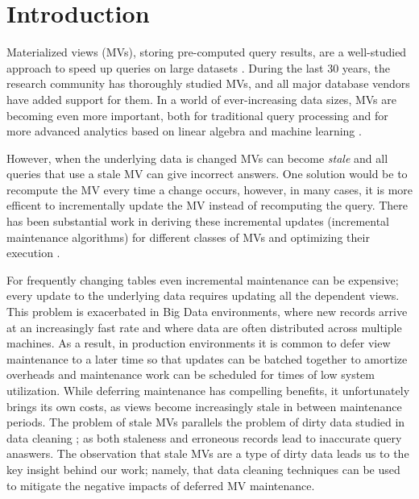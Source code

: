 \vspace{-0.5em}
\section{Introduction}
Materialized views (MVs), storing pre-computed query results, are a well-studied approach to speed up queries on large datasets \cite{LarsonY85, gupta1995maintenance, chirkova2011materialized, halevy2001answering}.
During the last 30 years, the research community has thoroughly studied MVs, and all major database vendors have added support for them.
In a world of ever-increasing data sizes, MVs are becoming even more important, both for traditional query processing
 \cite{lefevre2014opportunistic, bailis2014scalable, perez2014history} and for more advanced analytics based on linear algebra and machine learning \cite{nikolic2014linview, zhang2014mat}.

However, when the underlying data is changed MVs can become \emph{stale} and all queries that use a stale MV can give incorrect answers. 
One solution would be to recompute the MV every time a change occurs, however, in many cases, it is more efficent to incrementally update the MV instead of recomputing the query.
There has been substantial work in deriving these incremental updates (incremental maintenance algorithms) for different classes of MVs and optimizing their execution \cite{gupta1995maintenance, DBLP:conf/sigmod/GriffinL95, griffin1997improved, samtani1999self, DBLP:conf/sac/TrutaC07, DBLP:journals/vldb/KochAKNNLS14, chirkova2011materialized}.

For frequently changing tables even incremental maintenance can be expensive; every update to the underlying data requires updating all the dependent views.  
This problem is exacerbated in Big Data environments, where new records arrive at an increasingly fast rate and where data are often 
distributed across multiple machines.  
As a result, in production environments it is common to defer view maintenance to a later time \cite{chirkova2011materialized, zhou2007lazy, DBLP:conf/sigmod/ColbyGLMT96} so that updates can be batched together to amortize overheads and maintenance work can be scheduled for times of low system utilization.  
While deferring maintenance has compelling benefits, it unfortunately brings its own costs, as views become increasingly stale in between maintenance periods.   
The problem of stale MVs parallels the problem of dirty data studied in data cleaning \cite{rahm2000data}; as both staleness and erroneous records lead to inaccurate query anaswers.
The observation that stale MVs are a type of dirty data leads us to the key insight behind our work; namely, that data cleaning techniques can be used to mitigate the negative impacts of deferred MV maintenance.  

